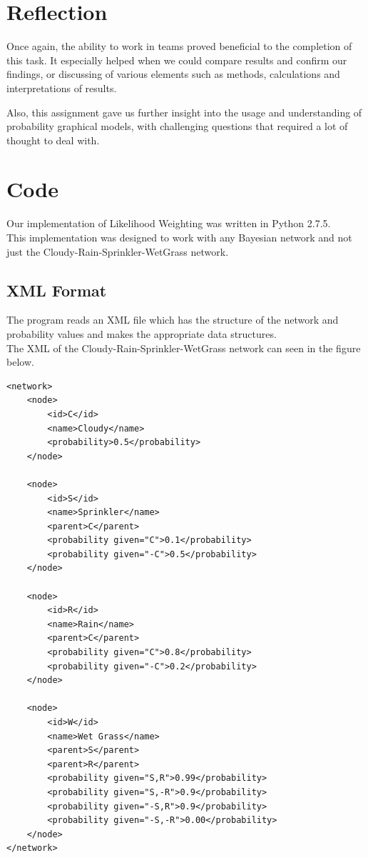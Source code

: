 \documentclass{article}
\begin{document}
\section{Reflection}
Once again, the ability to work in teams proved beneficial to the completion of this task. It especially helped when we could compare results and confirm our findings, or discussing of various elements such as methods, calculations and interpretations of results. 

Also, this assignment gave us further insight into the usage and understanding of probability graphical models, with challenging questions that required a lot of thought to deal with.  
\section{Code}
Our implementation of Likelihood Weighting was written in Python 2.7.5.\\

This implementation was designed to work with any Bayesian network and not just the Cloudy-Rain-Sprinkler-WetGrass network.

\subsection{XML Format}
The program reads an XML file which has the structure of the network and probability values and makes the appropriate data structures.\\

The XML of the Cloudy-Rain-Sprinkler-WetGrass network can seen in the figure below.

\begin{minipage}{\linewidth}
\begin{lstlisting}
<network>
	<node>
		<id>C</id>
		<name>Cloudy</name>
		<probability>0.5</probability>
	</node>

	<node>
		<id>S</id>
		<name>Sprinkler</name>
		<parent>C</parent>
		<probability given="C">0.1</probability>
		<probability given="-C">0.5</probability>
	</node>
	
	<node>
		<id>R</id>
		<name>Rain</name>
		<parent>C</parent>
		<probability given="C">0.8</probability>
		<probability given="-C">0.2</probability>
	</node>
	
	<node>
		<id>W</id>
		<name>Wet Grass</name>
		<parent>S</parent>
		<parent>R</parent>
		<probability given="S,R">0.99</probability>
		<probability given="S,-R">0.9</probability>
		<probability given="-S,R">0.9</probability>
		<probability given="-S,-R">0.00</probability>
	</node>
</network>
\end{lstlisting}
\end{minipage}\\
\end{document}
